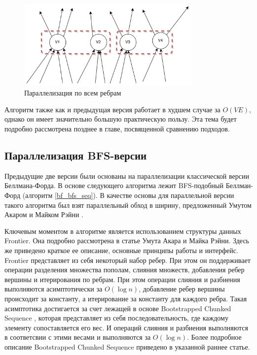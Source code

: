 \begin{figure}[h]
\centering
\includegraphics[width=0.8\textwidth]{img/bf_par_2_2.png}
\caption{Параллелизация по всем ребрам}
\label{bf_par_2_2}
\end{figure}


Алгоритм также как и предыдущая версия работает в худшем случае за $O(VE)$, однако он имеет значительно большую практическую пользу. Эта тема будет подробно рассмотрена позднее в главе, посвященной сравнению подходов.


\FloatBarrier
\subsection{Параллелизация BFS-версии}
Предыдущие две версии были основаны на параллелизации классической версии Беллмана-Форда. В основе следующего алгоритма лежит BFS-подобный Беллман-Форд (алгоритм \ref{bf_bfs_seq}). В качестве основы для параллельной версии такого алгоритма был взят параллельный обход в ширину, предложенный Умутом Акаром и Майком Рэйни \cite{FRONTIERSEARCH}. 


Ключевым моментом в алгоритме является использованием структуры данных Frontier. Она подробно рассмотрена в статье Умута Акара и Майка Рэйни. Здесь же приведено краткое ее описание, основные принципы работы и интерфейс. Frontier представляет из себя некоторый набор ребер. При этом он поддерживает операции разделения множества пополам, слияния множеств, добавления ребер вершины и итерирования по ребрам. При этом  операции слияния и разбиения выполняются асимптотически за $O(\log n)$, добавление ребер вершины происходит за константу, а итерирование за константу для каждого ребра. Такая асимптотика достигается за счет лежащей в основе Bootstrapped Chunked Sequence \cite{CHUNKEDSEQ}, которая представляет из себя последовательность, где каждому элементу сопоставляется его вес. И операций слияния и разбиения выполняются в соответсвии с этими весами и выполняются за $O(\log n)$. Более подробное описание Bootstrapped Chunked Sequence приведено в указанной раннее статье. 

